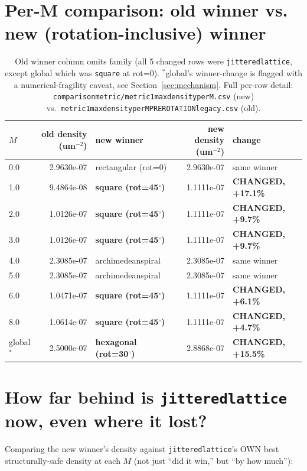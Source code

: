 \documentclass[11pt]{article}
\renewcommand{\_}{\origunderscore\penalty0\hskip0pt\relax}
\begin{document}
\section{Per-M comparison: old winner vs. new (rotation-inclusive) winner}
\begin{table}[h]
\centering\footnotesize
\setlength{\tabcolsep}{4pt}
\begin{tabular}{lrlrl}
\toprule
\textbf{$M$} & \textbf{old density (um$^{-2}$)} & \textbf{new winner} & \textbf{new density (um$^{-2}$)} & \textbf{change} \\
\midrule
0.0 & 2.9630e-07 & rectangular (rot=0) & 2.9630e-07 & same winner \\
1.0 & 9.4864e-08 & \textbf{square (rot=45$^\circ$)} & 1.1111e-07 & \textbf{CHANGED, +17.1\%} \\
2.0 & 1.0126e-07 & \textbf{square (rot=45$^\circ$)} & 1.1111e-07 & \textbf{CHANGED, +9.7\%} \\
3.0 & 1.0126e-07 & \textbf{square (rot=45$^\circ$)} & 1.1111e-07 & \textbf{CHANGED, +9.7\%} \\
4.0 & 2.3085e-07 & archimedean\_spiral & 2.3085e-07 & same winner \\
5.0 & 2.3085e-07 & archimedean\_spiral & 2.3085e-07 & same winner \\
6.0 & 1.0471e-07 & \textbf{square (rot=45$^\circ$)} & 1.1111e-07 & \textbf{CHANGED, +6.1\%} \\
8.0 & 1.0614e-07 & \textbf{square (rot=45$^\circ$)} & 1.1111e-07 & \textbf{CHANGED, +4.7\%} \\
global$^\ast$ & 2.5000e-07 & \textbf{hexagonal (rot=30$^\circ$)} & 2.8868e-07 & \textbf{CHANGED, +15.5\%} \\
\bottomrule
\end{tabular}
\caption{Old winner column omits family (all 5 changed rows were
\texttt{jittered\_lattice}, except global which was \texttt{square} at rot=0).
$^\ast$global's winner-change is flagged with a numerical-fragility caveat, see
Section~\ref{sec:mechanism}. Full per-row detail:
\texttt{comparison\_metric/metric1\_max\_density\_per\_M.csv} (new) vs.\
\texttt{metric1\_max\_density\_per\_M\_PREROTATION\_legacy.csv} (old).}
\end{table}

\section{How far behind is \texttt{jittered\_lattice} now, even where it lost?}
Comparing the new winner's density against \texttt{jittered\_lattice}'s OWN best
structurally-safe density at each $M$ (not just ``did it win,'' but ``by how
much''):
\end{document}

